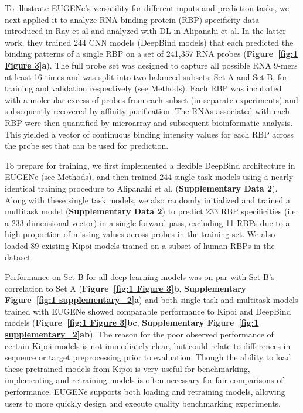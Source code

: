 To illustrate EUGENe’s versatility for different inputs and prediction tasks, we next applied it to analyze RNA binding protein (RBP) specificity data introduced in Ray et al\cite{Ray2013-yd} and analyzed with DL in Alipanahi et al\cite{Alipanahi2015-ef}. In the latter work, they trained 244 CNN models (DeepBind models) that each predicted the binding patterns of a single RBP on a set of 241,357 RNA probes (\textbf{Figure~\ref{fig:1 Figure 3}a}). The full probe set was designed to capture all possible RNA 9-mers at least 16 times and was split into two balanced subsets, Set A and Set B, for training and validation respectively (see Methods)\cite{Ray2013-yd}. Each RBP was incubated with a molecular excess of probes from each subset (in separate experiments) and subsequently recovered by affinity purification. The RNAs associated with each RBP were then quantified by microarray and subsequent bioinformatic analysis\cite{Berger2009-la}. This yielded a vector of continuous binding intensity values for each RBP across the probe set that can be used for prediction.

To prepare for training, we first implemented a flexible DeepBind architecture in EUGENe (see Methods), and then trained 244 single task models using a nearly identical training procedure to Alipanahi et al. (\textbf{Supplementary Data 2}). Along with these single task models, we also randomly initialized and trained a multitask model (\textbf{Supplementary Data 2}) to predict 233 RBP specificities (i.e. a 233 dimensional vector) in a single forward pass, excluding 11 RBPs due to a high proportion of missing values across probes in the training set. We also loaded 89 existing Kipoi\cite{Avsec2019-ke} models trained on a subset of human RBPs in the dataset.

Performance on Set B for all deep learning models was on par with Set B’s correlation to Set A (\textbf{Figure~\ref{fig:1 Figure 3}b}, \textbf{Supplementary Figure~\ref{fig:1 supplementary_2}a}) and both single task and multitask models trained with EUGENe showed comparable performance to Kipoi and DeepBind models (\textbf{Figure~\ref{fig:1 Figure 3}b}\textbf{c}, \textbf{Supplementary Figure~\ref{fig:1 supplementary_2}a}\textbf{b}). The reason for the poor observed performance of certain Kipoi models is not immediately clear, but could relate to differences in sequence or target preprocessing prior to evaluation. Though the ability to load these pretrained models from Kipoi is very useful for benchmarking, implementing and retraining models is often necessary for fair comparisons of performance. EUGENe supports both loading and retraining models, allowing users to more quickly design and execute quality benchmarking experiments. 

